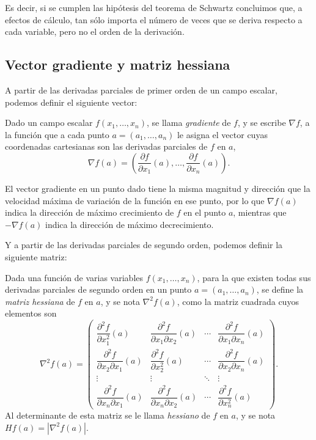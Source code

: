 Es decir, si se cumplen las hipótesis del teorema de Schwartz concluimos que, a efectos de cálculo, tan sólo importa el
número de veces que se deriva respecto a cada variable, pero no el orden de la derivación.

\subsection{Vector gradiente y matriz hessiana}
A partir de las derivadas parciales de primer orden de un campo escalar, podemos definir el siguiente vector:

\begin{definicion}
Dado un campo escalar $f(x_1,\ldots,x_n)$, se llama \emph{gradiente} de $f$, y se escribe $\nabla f$, a la función que a
cada punto $a=(a_1,\ldots,a_n)$ le asigna el vector cuyas coordenadas cartesianas son las derivadas parciales de $f$ en
$a$,
\[
\nabla f(a)=\left(\frac{\partial f}{\partial x_1}(a),\ldots,\frac{\partial f}{\partial x_n}(a)\right).
\]
\end{definicion}

El vector gradiente en un punto dado tiene la misma magnitud y dirección que la velocidad máxima de variación de la
función en ese punto, por lo que $\nabla f(a)$ indica la dirección de máximo crecimiento de $f$ en el punto $a$,
mientras que $-\nabla f(a)$ indica la dirección de máximo decrecimiento.

Y a partir de las derivadas parciales de segundo orden, podemos definir la siguiente matriz:

\begin{definicion}
Dada una función de varias variables $f(x_1,\ldots,x_n)$, para la que existen todas sus derivadas parciales de segundo
orden en un punto $a=(a_1,\ldots,a_n)$, se define la \emph{matriz hessiana} de $f$ en $a$, y se nota $\nabla^2f(a)$, como la
matriz cuadrada cuyos elementos son
\[
\nabla^2f(a)=\left(
\begin{array}{cccc}
\dfrac{\partial^2 f}{\partial x_1^2}(a) & 
\dfrac{\partial^2 f}{\partial x_1 \partial x_2}(a) &
\cdots &
\dfrac{\partial^2 f}{\partial x_1 \partial x_n}(a)\\
\dfrac{\partial^2 f}{\partial x_2 \partial x_1}(a) &
\dfrac{\partial^2 f}{\partial x_2^2}(a) & 
\cdots &
\dfrac{\partial^2 f}{\partial x_2 \partial x_n}(a)\\
\vdots & \vdots & \ddots & \vdots \\
\dfrac{\partial^2 f}{\partial x_n \partial x_1}(a) &
\dfrac{\partial^2 f}{\partial x_n \partial x_2}(a) &
\cdots &
\dfrac{\partial^2 f}{\partial x_n^2}(a)
\end{array}
\right).
\]
Al determinante de esta matriz se le llama \emph{hessiano} de $f$ en $a$, y se nota $Hf(a)=|\nabla^2f(a)|$.
\end{definicion}

